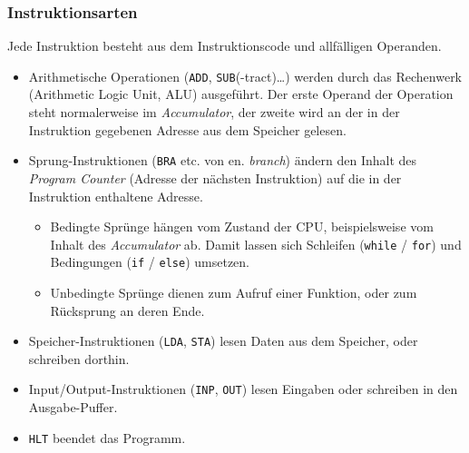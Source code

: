 \subsubsection{Instruktionsarten}
Jede Instruktion besteht aus dem Instruktionscode und allfälligen Operanden.
\begin{itemize}
	\item Arithmetische Operationen (\texttt{ADD}, \texttt{SUB}(-tract)…) werden durch das Rechenwerk (Arithmetic Logic Unit, ALU) ausgeführt. Der erste Operand der Operation steht normalerweise im \emph{Accumulator}, der zweite wird an der in der Instruktion gegebenen Adresse aus dem Speicher gelesen.
	\item Sprung-Instruktionen (\texttt{BRA} etc. von en. \emph{branch}) ändern den Inhalt des \emph{Program Counter} (Adresse der nächsten Instruktion) auf die in der Instruktion enthaltene Adresse.
	\begin{itemize}
		\item Bedingte Sprünge hängen vom Zustand der CPU, beispielsweise vom Inhalt des \emph{Accumulator} ab. Damit lassen sich Schleifen (\texttt{while} / \texttt{for}) und Bedingungen (\texttt{if} / \texttt{else}) umsetzen.
		\item Unbedingte Sprünge dienen zum Aufruf einer Funktion, oder zum Rücksprung an deren Ende.
	\end{itemize}
	\item Speicher-Instruktionen (\texttt{LDA}, \texttt{STA}) lesen Daten aus dem Speicher, oder schreiben dorthin.
	\item Input/Output-Instruktionen (\texttt{INP}, \texttt{OUT}) lesen Eingaben oder schreiben in den Ausgabe-Puffer.
	\item \texttt{HLT} beendet das Programm.
\end{itemize}

